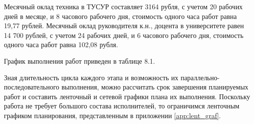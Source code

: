 Месячный оклад техника в ТУСУР составляет 3164 рубля, с учетом 20 рабочих дней в месяце, и 8 часового рабочего дня, стоимость одного часа работ равна 19,77 рублей. Месячный оклад руководителя к.н., доцента в университете равен 14 700 рублей\cite{money}, с учетом 24 рабочих дней, и 6 часового рабочего дня, стоимость одного часа работ равна 102,08 рубля.

График выполнения работ приведен в таблице 8.1.

Зная длительность цикла каждого этапа и возможность их параллельно-последовательного выполнения, можно рассчитать срок завершения планируемых работ и составить ленточный и сетевой графики плана их выполнения. Поскольку работа не требует большого состава исполнителей, то ограничимся ленточным графиком планирования, представленным в приложении \ref{app:lent_graf}.

 
 
 